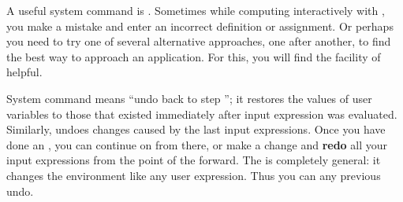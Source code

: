 {{{{{{{{A useful system command is .
Sometimes while computing interactively with \Language{}, you make
a mistake and enter an incorrect definition or assignment.
Or perhaps you
need to try one of several alternative approaches, one after
another, to find the best way to approach an application.
For this, you will find the  facility of
\Language{} helpful.

System command  means ``undo back to step ''; it
restores the values of user variables to those that existed
immediately after input expression  was evaluated.
Similarly,  undoes changes caused by the last
 input expressions.
Once you have done an ,
you can continue on from there, or make a change and
{\bf redo} all your input expressions from the point
of the  forward.
The  is completely general: it changes the environment
like any user expression.
Thus you can  any previous undo.

}}}}}}}}
